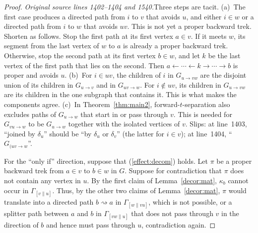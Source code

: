 \documentclass[12pt]{amsart}
\theoremstyle{plain}
\theoremstyle{definition}
\theoremstyle{remark}
\numberwithin{equation}{section}
\theoremstyle{plain}
\newcommand{\0}{\emptyset}
\newcommand{\stri}{\Gamma}
\begin{document}
\begin{proof}
{\textit{Original source lines 1402--1404 and 1540.}\quad Three steps are tacit. (a)~The first case produces a directed path from $i$ to $v$ that avoids $u$, and either $i \in w$ or a directed path from $i$ to $w$ that avoids $uv$. This is not yet a proper backward trek. Shorten as follows. Stop the first path at its first vertex $a \in v$. If it meets $w$, its segment from the last vertex of $w$ to $a$ is already a proper backward trek. Otherwise, stop the second path at its first vertex $b \in w$, and let $k$ be the last vertex of the first path that lies on the second. Then $a \leftarrow \cdots \leftarrow k \rightarrow \cdots \rightarrow b$ is proper and avoids $u$. (b)~For $i \in uv$, the children of $i$ in $G_{u \rightarrow vw}$ are the disjoint union of its children in $G_{u \rightarrow v}$ and in $G_{uv \rightarrow w}$. For $i \notin uv$, its children in $G_{u \rightarrow vw}$ are its children in the one subgraph that contains it. This is what makes the components agree. (c)~In Theorem~\ref{thm:main2}, forward-$t$-separation also excludes paths of $G_{u \rightarrow w}$ that start in or pass through $v$. This is needed for $G_{vu \rightarrow w}$ to be $G_{u \rightarrow w}$ together with the isolated vertices of $v$. Slips: at line~1403, ``joined by $\delta_u$'' should be ``by $\delta_u$ or $\delta_v$'' (the latter for $i \in v$); at line~1404, ``$G_{(uv \rightarrow w}$''.
}

For the ``only if'' direction, suppose that (\ref{effect:decom}) holds. Let $\pi$ be a proper backward trek from $a \in v$ to $b \in w$ in $G$. Suppose for contradiction that $\pi$ does not contain any vertex in $u$. By the first claim of Lemma~\ref{decor:mat},  $\kappa_b$ cannot occur  in $\stri_{[v \| u]}$. Thus, by the other two claims of Lemma~\ref{decor:mat}, $\pi$  would translate into  a directed path $b \rightsquigarrow a$ in $\stri_{[w \| v u]}$, which is not possible, or a splitter path between  $a$ and $b$ in $\stri_{[vw \| u]}$ that does not pass  through $v$ in the direction of $b$ and hence must pass through $u$, contradiction again.
\end{proof}
\end{document}
